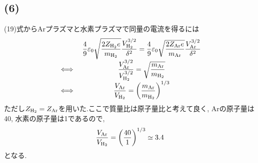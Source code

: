 \documentclass[uplatex,a4j,11pt,dvipdfmx]{jsarticle}
\begin{document}
\subsection*{(6)}
(19)式からArプラズマと水素プラズマで同量の電流を得るには
\begin{align}
  \everymath{\displaystyle}
  \begin{array}{cc}
    &\frac{4}{9}\varepsilon_0\sqrt{\frac{2Z_{\rm H_2}e}{m_{\rm H_2}}}\frac{V_{\rm H_2}^{3/2}}{\delta^2}
    =\frac{4}{9}\varepsilon_0\sqrt{\frac{2Z_{\rm Ar}e}{m_{\rm Ar}}}\frac{V_{\rm Ar}^{3/2}}{\delta^2}\\
    \iff&\frac{V_{\rm Ar}^{3/2}}{V_{\rm H_2}^{3/2}}=\sqrt{\frac{m_{\rm Ar}}{m_{\rm H_2}}}\\
    \iff&\frac{V_{\rm Ar}}{V_{\rm H_2}}=\left(\frac{m_{\rm Ar}}{m_{\rm H_2}}\right)^{1/3}
  \end{array}
\end{align}
ただし$Z_{\rm H_2}=Z_{\rm Ar}$を用いた.ここで質量比は原子量比と考えて良く, Arの原子量は40, 水素の原子量は1であるので,
\begin{align}
  \frac{V_{\rm Ar}}{V_{\rm H_2}}=\left(\frac{40}{1}\right)^{1/3}\simeq3.4
\end{align}
となる.
\end{document}
